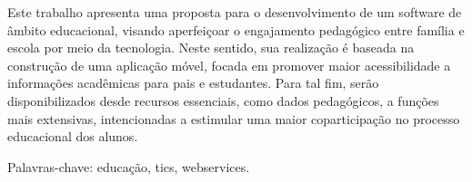 \begin{resumo}
Este trabalho apresenta uma proposta para o desenvolvimento de um software de âmbito educacional, visando aperfeiçoar o engajamento pedagógico entre família e escola por meio da tecnologia. Neste sentido, sua realização é baseada na construção de uma aplicação móvel, focada em promover maior acessibilidade a informações acadêmicas para pais e estudantes. Para tal fim, serão disponibilizados desde recursos essenciais, como dados pedagógicos, a funções mais extensivas, intencionadas a estimular uma maior coparticipação no processo educacional dos alunos.

Palavras-chave: educação, tics, webservices.




\end{resumo}